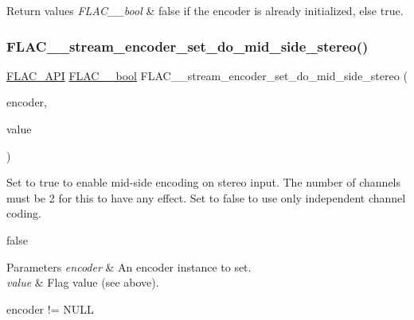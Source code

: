 \begin{DoxyRetVals}{Return values}
{\em F\+L\+A\+C\+\_\+\+\_\+bool} & {\ttfamily false} if the encoder is already initialized, else {\ttfamily true}. \\
\hline
\end{DoxyRetVals}
\mbox{\label{group__flac__stream__encoder_gadbd1084da109cf0ddd007a5c64027504}} 
\subsubsection{\texorpdfstring{F\+L\+A\+C\+\_\+\+\_\+stream\+\_\+encoder\+\_\+set\+\_\+do\+\_\+mid\+\_\+side\+\_\+stereo()}{FLAC\_\_stream\_encoder\_set\_do\_mid\_side\_stereo()}}
{\footnotesize\ttfamily \hyperlink{group__flac__export_ga56ca07df8a23310707732b1c0007d6f5}{F\+L\+A\+C\+\_\+\+A\+PI} \hyperlink{ordinals_8h_a95103469f1cbd78b8cf250194985b34e}{F\+L\+A\+C\+\_\+\+\_\+bool} F\+L\+A\+C\+\_\+\+\_\+stream\+\_\+encoder\+\_\+set\+\_\+do\+\_\+mid\+\_\+side\+\_\+stereo (\begin{DoxyParamCaption}\item[{\hyperlink{struct_f_l_a_c_____stream_encoder}{F\+L\+A\+C\+\_\+\+\_\+\+Stream\+Encoder} $\ast$}]{encoder,  }\item[{\hyperlink{ordinals_8h_a95103469f1cbd78b8cf250194985b34e}{F\+L\+A\+C\+\_\+\+\_\+bool}}]{value }\end{DoxyParamCaption})}

Set to {\ttfamily true} to enable mid-\/side encoding on stereo input. The number of channels must be 2 for this to have any effect. Set to {\ttfamily false} to use only independent channel coding.

{\ttfamily false} 
\begin{DoxyParams}{Parameters}
{\em encoder} & An encoder instance to set. \\
\hline
{\em value} & Flag value (see above).  
\begin{DoxyCode}
encoder != NULL 
\end{DoxyCode}
 \\
\hline
\end{DoxyParams}

